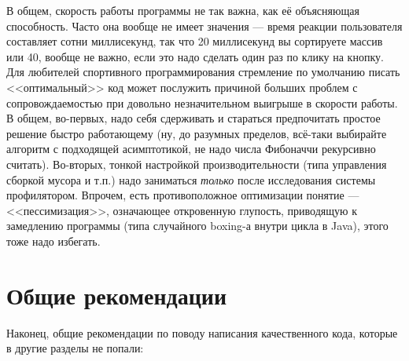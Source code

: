 \documentclass[a5paper]{article}
\begin{document}
В общем, скорость работы программы не так важна, как её объясняющая способность. Часто она вообще не имеет значения --- время реакции пользователя составляет сотни миллисекунд, так что 20 миллисекунд вы сортируете массив или 40, вообще не важно, если это надо сделать один раз по клику на кнопку. Для любителей спортивного программирования стремление по умолчанию писать <<оптимальный>> код может послужить причиной больших проблем с сопровождаемостью при довольно незначительном выигрыше в скорости работы. В общем, во-первых, надо себя сдерживать и стараться предпочитать простое решение быстро работающему (ну, до разумных пределов, всё-таки выбирайте алгоритм с подходящей асимптотикой, не надо числа Фибоначчи рекурсивно считать). Во-вторых, тонкой настройкой производительности (типа управления сборкой мусора и т.п.) надо заниматься \textit{только} после исследования системы профилятором. Впрочем, есть противоположное оптимизации понятие --- <<пессимизация>>, означающее откровенную глупость, приводящую к замедлению программы (типа случайного boxing-а внутри цикла в Java), этого тоже надо избегать.

\section{Общие рекомендации}

Наконец, общие рекомендации по поводу написания качественного кода, которые в другие разделы не попали:
\end{document}
